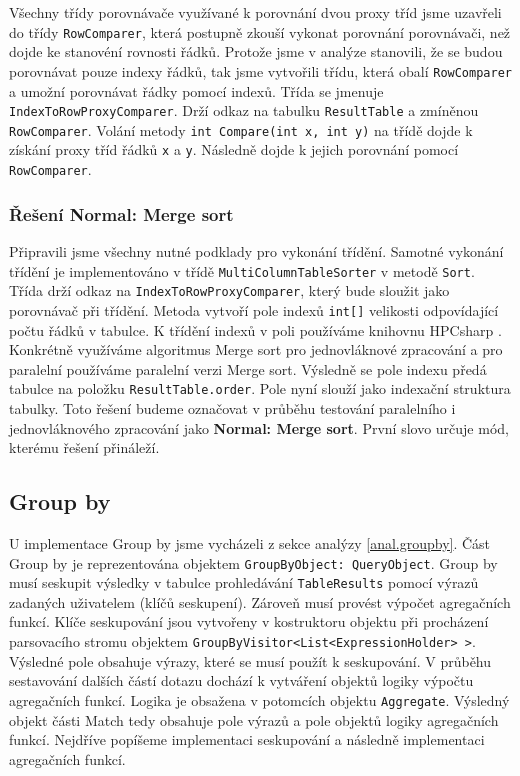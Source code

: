 Všechny třídy porovnávače využívané k porovnání dvou proxy tříd jsme uzavřeli do třídy \texttt{RowComparer}, která postupně zkouší vykonat porovnání porovnávači, než dojde ke stanovéní rovnosti řádků.
Protože jsme v analýze stanovili, že se budou porovnávat pouze indexy řádků, tak jsme vytvořili třídu, která obalí \texttt{RowComparer} a umožní porovnávat řádky pomocí indexů. 
Třída se jmenuje \texttt{IndexToRowProxyComparer}.
Drží odkaz na tabulku \texttt{ResultTable} a zmíněnou \texttt{RowComparer}.
Volání metody \texttt{int Compare(int x, int y)} na třídě dojde k získání proxy tříd řádků \texttt{x} a \texttt{y}.
Následně dojde k jejich porovnání pomocí \texttt{RowComparer}.

\subsubsection{Řešení Normal: Merge sort}

Připravili jsme všechny nutné podklady pro vykonání třídění.
Samotné vykonání třídění je implementováno v třídě \texttt{MultiColumnTableSorter} v metodě \texttt{Sort}.
Třída drží odkaz na \texttt{IndexToRowProxyComparer}, který bude sloužit jako porovnávač při třídění.
Metoda vytvoří pole indexů \texttt{int[]} velikosti odpovídající počtu řádků v tabulce.
K třídění indexů v poli používáme knihovnu HPCsharp \citep{hpcsharp}.
Konkrétně využíváme algoritmus Merge sort pro jednovláknové zpracování a pro paralelní používáme paralelní verzi Merge sort.
Výsledně se pole indexu předá tabulce na položku \texttt{ResultTable.order}.
Pole nyní slouží jako indexační struktura tabulky.
Toto řešení budeme označovat v průběhu testování paralelního i jednovláknového zpracování jako \textbf{Normal: Merge sort}.
První slovo určuje mód, kterému řešení přináleží.

\subsection{Group by}

U implementace Group by jsme vycházeli z sekce analýzy \ref{anal.groupby}.
Část Group by je reprezentována objektem \texttt{GroupByObject: QueryObject}.
Group by musí seskupit výsledky v tabulce prohledávání \texttt{TableResults} pomocí výrazů zadaných uživatelem (klíčů seskupení).
Zároveň musí provést výpočet agregačních funkcí.
Klíče seskupování jsou vytvořeny v kostruktoru objektu při procházení parsovacího stromu objektem \texttt{GroupByVisitor<List<ExpressionHolder> >}.
Výsledné pole obsahuje výrazy, které se musí použít k seskupování.
V průběhu sestavování dalších částí dotazu dochází k vytváření objektů logiky výpočtu agregačních funkcí.
Logika je obsažena v potomcích objektu \texttt{Aggregate}.
Výsledný objekt části Match tedy obsahuje pole výrazů a pole objektů logiky agregačních funkcí.
Nejdříve popíšeme implementaci seskupování a následně implementaci agregačních funkcí.


